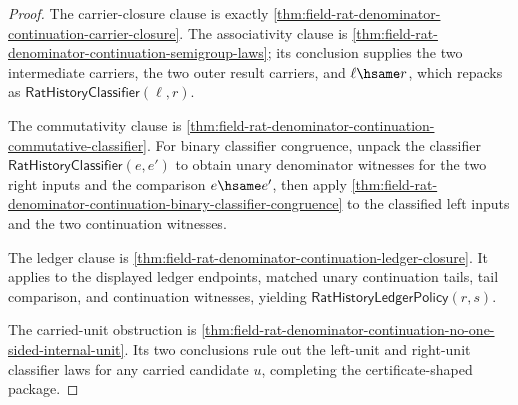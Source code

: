 \begin{proof}
The carrier-closure clause is exactly
\autoref{thm:field-rat-denominator-continuation-carrier-closure}. The
associativity clause is
\autoref{thm:field-rat-denominator-continuation-semigroup-laws}; its conclusion
supplies the two intermediate carriers, the two outer result carriers, and
$\ell\hsame r$, which repacks as
$\mathsf{RatHistoryClassifier}(\ell,r)$.

The commutativity clause is
\autoref{thm:field-rat-denominator-continuation-commutative-classifier}. For
binary classifier congruence, unpack the classifier
$\mathsf{RatHistoryClassifier}(e,e')$ to obtain unary denominator witnesses for
the two right inputs and the comparison $e\hsame e'$, then apply
\autoref{thm:field-rat-denominator-continuation-binary-classifier-congruence}
to the classified left inputs and the two continuation witnesses.

The ledger clause is
\autoref{thm:field-rat-denominator-continuation-ledger-closure}. It applies to
the displayed ledger endpoints, matched unary continuation tails, tail
comparison, and continuation witnesses, yielding
$\mathsf{RatHistoryLedgerPolicy}(r,s)$.

The carried-unit obstruction is
\autoref{thm:field-rat-denominator-continuation-no-one-sided-internal-unit}. Its
two conclusions rule out the left-unit and right-unit classifier laws for any
carried candidate $u$, completing the certificate-shaped package.
\end{proof}

